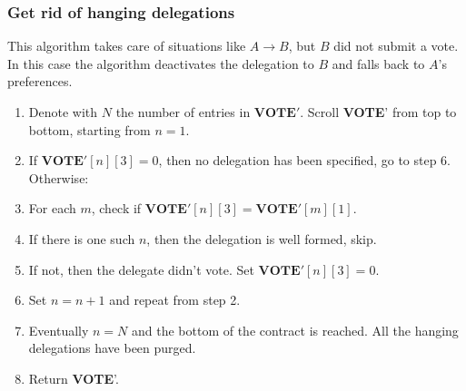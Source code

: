 \documentclass[submission, copyright,creativecommons,sharealike,noncommercial]{eptcs}
\newcommand{\Vote}{\textbf{VOTE}\xspace}
\begin{document}
\subsubsection{Get rid of hanging delegations}\label{subsubsec:Get rid of hanging delegations}
	This algorithm takes care of situations like $A \to B$, but $B$ did not submit a vote. In this case the algorithm deactivates the delegation to $B$ and falls back to $A$'s preferences.
	\begin{enumerate}
		\item Denote with $N$ the number of entries in $\Vote'$. Scroll \Vote' from top to bottom, starting from $n=1$.
		\item If $\Vote'[n][3]=0$, then no delegation has been specified, go to step 6. Otherwise:
		\item For each $m$, check if $\Vote'[n][3] = \Vote'[m][1]$.
		\item If there is one such $n$, then the delegation is well formed, skip.
		\item If not, then the delegate didn't vote. Set $\Vote'[n][3] = 0$.
		\item Set $n=n+1$ and repeat from step 2.
		\item Eventually $n = N$ and the bottom of the contract is reached. All the hanging delegations have been purged.
		\item Return \Vote'.
	\end{enumerate}

	
\end{document}
